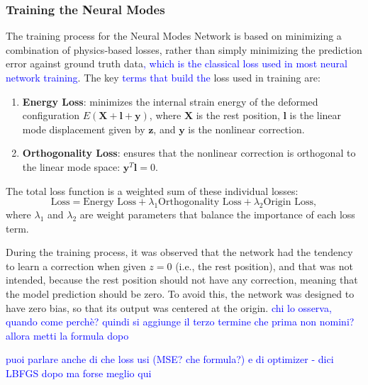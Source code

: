 \subsubsection{Training the Neural Modes}
The training process for the Neural Modes Network is based on minimizing a combination of physics-based losses, rather than simply minimizing the prediction error against ground truth data\textcolor{blue}{, which is the classical loss used in most neural network training}. The key \textcolor{blue}{ terms that build the }loss used in training are:

\begin{enumerate}
    \item \textbf{Energy Loss}: minimizes the internal strain energy of the deformed configuration $E(\bm{X} + \bm{l} + \bm{y})$, where $\bm{X}$ is the rest position, $\bm{l}$ is the linear mode displacement given by $\bm{z}$, and $\bm{y}$ is the nonlinear correction.
    
    \item \textbf{Orthogonality Loss}: ensures that the nonlinear correction is orthogonal to the linear mode space: $\bm{y}^T \bm{l} = 0$.
    
\end{enumerate}

The total loss function is a weighted sum of these individual losses:
\begin{equation}
    \text{Loss} = \text{Energy Loss} + \lambda_1 \text{Orthogonality Loss} + \lambda_2 \text{Origin Loss},
\end{equation}
where $\lambda_1$ and $\lambda_2$ are weight parameters that balance the importance of each loss term.

During the training process, it was observed that the network had the tendency to learn a correction when given \(z = 0\) (i.e., the rest position), and that was not intended, because the rest position should not have any correction, meaning that the model prediction should be zero. To avoid this, the network was designed to have zero bias, so that its output was centered at the origin. \textcolor{blue}{chi lo osserva, quando come perchè? quindi si aggiunge il terzo termine che prima non nomini? allora metti la formula dopo}

\textcolor{blue}{puoi parlare anche di che loss usi (MSE? che formula?) e di optimizer - dici LBFGS dopo ma forse meglio qui}

